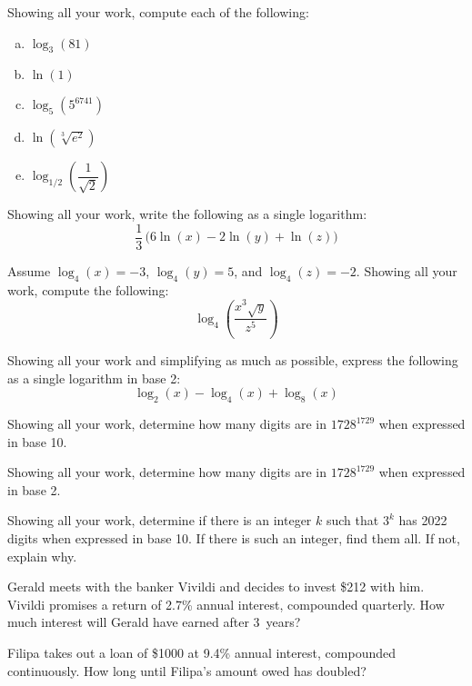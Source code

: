 \documentclass[12pt,letterpaper]{exam}
\begin{document}
\begin{questions}
\newpage
\question[10] Showing all your work, compute each of the following:
	\begin{enumerate}[(a)]
	\item $\log_3(81)$
	\item $\ln(1)$
	\item $\log_5(5^{6741})$
	\item $\ln(\sqrt[3]{e^2})$
	\item $\log_{1/2} \left( \dfrac{1}{\sqrt{2}} \right)$
	\end{enumerate}



\newpage
\question[10] Showing all your work, write the following as a single logarithm:
	\[
	\dfrac{1}{3}\, \big( 6 \ln(x) - 2 \ln(y) + \ln(z) \big)
	\]



\newpage
\question[10] Assume $\log_4(x)= -3$, $\log_4(y)= 5$, and $\log_4(z)= -2$. Showing all your work, compute the following:
	\[
	\log_4 \left( \dfrac{x^3 \sqrt{y}}{z^5} \right)
	\]



\newpage
\question[10] Showing all your work and simplifying as much as possible, express the following as a single logarithm in base 2:
	\[
	\log_2(x) - \log_4(x) + \log_8(x)
	\]



\newpage
\question[10] Showing all your work, determine how many digits are in $1728^{1729}$ when expressed in base 10. 



\newpage
\question[10] Showing all your work, determine how many digits are in $1728^{1729}$ when expressed in base 2. 



\newpage
\question[10] Showing all your work, determine if there is an integer $k$ such that $3^k$ has 2022 digits when expressed in base 10. If there is such an integer, find them all. If not, explain why. 



\newpage
\question[10] Gerald meets with the banker Vivildi and decides to invest \$212 with him. Vivildi promises a return of 2.7\% annual interest, compounded quarterly. How much interest will Gerald have earned after 3~years?



\newpage
\question[10] Filipa takes out a loan of \$1000 at 9.4\% annual interest, compounded continuously. How long until Filipa's amount owed has doubled?




\end{questions}
\end{document}
